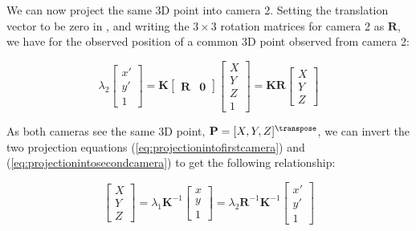 We can now project the same 3D point into camera 2. Setting the translation vector to be zero in \eqn{\ref{eq:combinedexpandedsmaller}}, and writing the $3\times3$ rotation matrices for camera 2 as $\mathbf{R}$, we have for the observed position of a common 3D point observed from camera 2:


\begin{equation}
    \lambda_2
    \begin{bmatrix}
        x' \\
        y' \\
        1
    \end{bmatrix}
    =
    \mathbf{K}
    \begin{bmatrix}
        \mathbf{R} & \mathbf{0}
    \end{bmatrix}
    \begin{bmatrix}
        X \\
        Y \\
        Z \\
        1
    \end{bmatrix}
    =
    \mathbf{K}  \mathbf{R}
    \begin{bmatrix}
        X \\
        Y \\
        Z
    \end{bmatrix}
    \label{eq:projectionintosecondcamera}
\end{equation}

As both cameras see the same 3D point, $\mathbf{P}=[X,Y,Z]^\transpose$, we can invert the two projection equations (\ref{eq:projectionintofirstcamera}) and (\ref{eq:projectionintosecondcamera}) to get the following relationship:


\begin{equation}
    \begin{bmatrix}
        X \\
        Y \\
        Z
    \end{bmatrix}
    =
    \lambda_1 \mathbf{K}^{-1}
    \begin{bmatrix}
        x \\
        y \\
        1
    \end{bmatrix}
    =
    \lambda_2 \mathbf{R}^{-1} \mathbf{K}^{-1}
    \begin{bmatrix}
        x' \\
        y' \\
        1
    \end{bmatrix}
    \label{eq:inverted_projectionintofirstcamera}
\end{equation}

